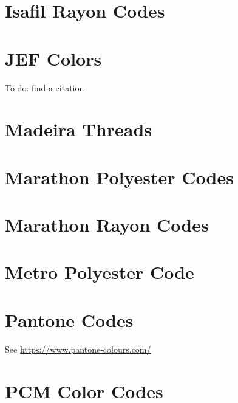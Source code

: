 \documentclass[a4paper]{report}
\begin{document}
%

\section{Isafil Rayon Codes}

%

\section{JEF Colors}

To do: find a citation

%

\section{Madeira Threads}

%

%

\section{Marathon Polyester Codes}

%

\section{Marathon Rayon Codes}

%

\section{Metro Polyester Code}

%

\section{Pantone Codes}

See \url{https://www.pantone-colours.com/}

%

\section{PCM Color Codes}
\end{document}
